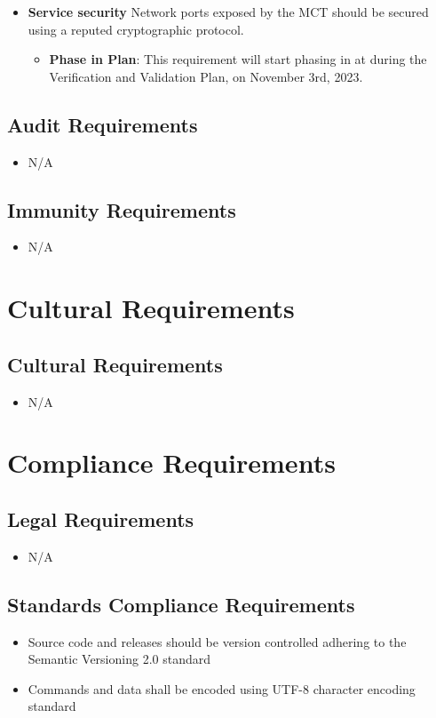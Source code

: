 \documentclass[12pt]{article}
\begin{document}
\begin{itemize}
    \item \textbf{Service security} Network ports exposed by the MCT should be secured using a reputed cryptographic protocol.
    \begin{itemize}
        \item \textbf{Phase in Plan}: This requirement will start phasing in at during the Verification and Validation Plan, on November 3rd, 2023. 
    \end{itemize}
\end{itemize}


\subsection{Audit Requirements}
\begin{itemize}
    \item N/A
\end{itemize}
\subsection{Immunity Requirements}
\begin{itemize}
    \item N/A
\end{itemize}

\section{Cultural Requirements}
\subsection{Cultural Requirements}
\begin{itemize}
    \item N/A
\end{itemize}

\section{Compliance Requirements}
\subsection{Legal Requirements}
\begin{itemize}
    \item N/A
\end{itemize}

\subsection{Standards Compliance Requirements}
\begin{itemize}
    \item Source code and releases should be version controlled adhering to the Semantic Versioning 2.0 standard
    \item Commands and data shall be encoded using UTF-8 character encoding standard
\end{itemize}
\end{document}
